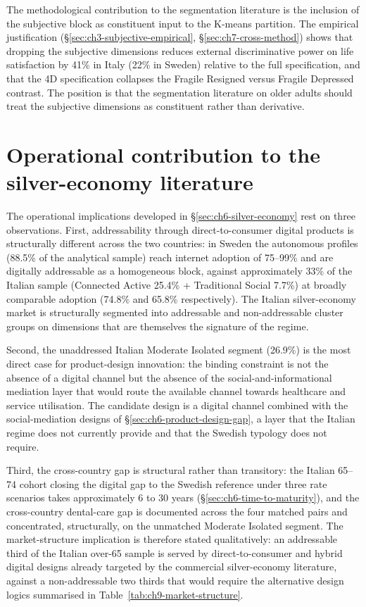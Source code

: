 The methodological contribution to the segmentation literature is the inclusion of the subjective block as constituent input to the K-means partition. The empirical justification (\S\ref{sec:ch3-subjective-empirical}, \S\ref{sec:ch7-cross-method}) shows that dropping the subjective dimensions reduces external discriminative power on life satisfaction by 41\% in Italy (22\% in Sweden) relative to the full specification, and that the 4D specification collapses the Fragile Resigned versus Fragile Depressed contrast. The position is that the segmentation literature on older adults should treat the subjective dimensions as constituent rather than derivative.

\section{Operational contribution to the silver-economy literature}
\label{sec:ch9-silver-economy}

The operational implications developed in \S\ref{sec:ch6-silver-economy} rest on three observations. First, addressability through direct-to-consumer digital products is structurally different across the two countries: in Sweden the autonomous profiles (88.5\% of the analytical sample) reach internet adoption of 75--99\% and are digitally addressable as a homogeneous block, against approximately 33\% of the Italian sample (Connected Active 25.4\% + Traditional Social 7.7\%) at broadly comparable adoption (74.8\% and 65.8\% respectively). The Italian silver-economy market is structurally segmented into addressable and non-addressable cluster groups on dimensions that are themselves the signature of the regime.

Second, the unaddressed Italian Moderate Isolated segment (26.9\%) is the most direct case for product-design innovation: the binding constraint is not the absence of a digital channel but the absence of the social-and-informational mediation layer that would route the available channel towards healthcare and service utilisation. The candidate design is a digital channel combined with the social-mediation designs of \S\ref{sec:ch6-product-design-gap}, a layer that the Italian regime does not currently provide and that the Swedish typology does not require.

Third, the cross-country gap is structural rather than transitory: the Italian 65--74 cohort closing the digital gap to the Swedish reference under three rate scenarios takes approximately 6 to 30 years (\S\ref{sec:ch6-time-to-maturity}), and the cross-country dental-care gap is documented across the four matched pairs and concentrated, structurally, on the unmatched Moderate Isolated segment. The market-structure implication is therefore stated qualitatively: an addressable third of the Italian over-65 sample is served by direct-to-consumer and hybrid digital designs already targeted by the commercial silver-economy literature, against a non-addressable two thirds that would require the alternative design logics summarised in Table~\ref{tab:ch9-market-structure}.

